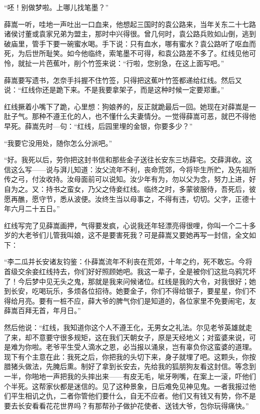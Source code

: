 “呸！别做梦啦。上哪儿找笔墨？” 

薛嵩一听，哇地一声吐出一口血来，他想起三国时的袁公路来，当年关东二十七路诸侯讨董或袁家兄弟为盟主，那时中兴得很。曾几何时，袁公路兵败如山倒，逃到破庙里，管手下要一碗蜜水喝。手下说：只有血水，哪有蜜水？袁公路听了呕血而死，为后世所耻笑。如今他临终，索笔墨不可得，和袁公路差不多了。红线见他可怜，就扯一片芭蕉叶，削个竹签来说：“行啦，您别急，在这上面写吧。” 

薛嵩要写遗书，怎奈手抖握不住竹签，只得把这蕉叶竹签都递给红线。然后又说：“红线你还是跪下来。不是我要拿架子，而是这种时候一定要郑重。” 

红线撅着小嘴下了跪，心里想：狗娘养的，反正就跪最后一回。她现在对薛嵩是一肚子气。那种不遵王化的人，也不懂什么夫妻情分。一觉得薛嵩可恶，就巴不得他早死。薛嵩先时—句：“红线，后园里埋的金银，你要多少？” 

“我要它没用处，随你怎么分派吧。” 

“好。我死以后，劳你把这封书信和那些金子送往长安东三坊薛宅。交薛湃收。这信这么写——说与湃儿知道：汝父流年不利，丧命荒郊，今将毕生所贮，及先祖所传之弓，付汝收持。汝母面前可以说知。汝少年有为，勿以父为念，努力上进，好自为之。又：持书之蛮女，乃父之侍妾红线。临终之时，多蒙彼服侍，吾死后，彼愿再醮，愿守节，悉从波便。汝终生当以母事之，不得有违，切切。父字，正德十年六月二十五日。” 

红线写完了见薛嵩画押，气得要发疯，心说我还年轻漂亮得很哩，你叫一个二十多岁的大老爷们儿管我叫娘，这不是要害死我？可是薛嵩又要她再写一封信，全文如下： 

“李二瓜并长安诸友钧鉴：仆薛嵩流年不利丧在荒郊，十年之约，死不敢忘。今将首级交余妾红线持去，你们好好照顾她吧。我这一辈子，全是被你们这批乌鸦咒坏了！今后梦中见无头之鬼，那就是我来问候诸位。红线是我的大令，对我很好；她到长安，吃喝玩乐，多烦各位招待。她要金子，你们不得给银子，要星星，你们不得给月亮。要有一桩不应，薛大爷的脾气你们是知道的，各位家里不免要闹宅，友薛嵩百拜无首，年月日。” 

然后他说：“红线，我知道你这个人不遵王化，无男女之礼法。尔见老爷英雄就走了来，却不意要守很多规矩，这在我们天朝女子，原是天经地义；对蛮婆来说，可是难为你啦。老爷平生受人滴水之恩，必当报以涌泉，岂有辜负你这蛮婆的道理。现下有个主意在此：我死之后，你把我的头切下来，身子就埋了吧。这颗头，你按腊猪头做法，先腌后熏。制好了拿到长安去，先给我的狐朋狗友看这封信。等念到一半，你啪地一声把我的头摔出来——有皮无毛，呲牙咧嘴，在案上一滚，吓他们个半死。这帮家伙都是迷信的。见了这种景象，日后难免见神见鬼。一者我报过他们平生相讥之仇，二者你管他们要什么，自无不应者。他们又有钱又有势，你不是要去长安看看花花世界吗？有那帮孙子做护花使者、送钱大爷，包你玩得痛快。” 

